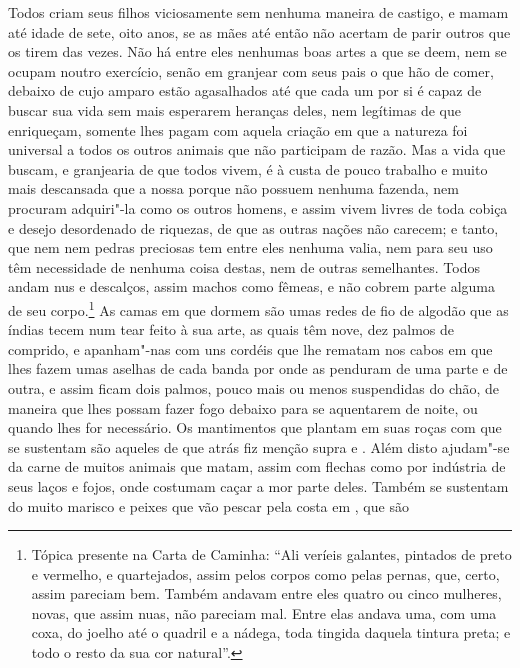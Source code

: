  Todos criam seus filhos viciosamente sem nenhuma maneira de castigo, e			%
mamam até idade de sete, oito anos, se as mães até então não acertam de
parir outros que os tirem das vezes. Não há entre eles nenhumas boas
artes a que se deem, nem se ocupam noutro exercício, senão em granjear
com seus pais o que hão de comer, debaixo de cujo amparo estão
agasalhados até que cada um por si é capaz de buscar sua vida sem mais
esperarem heranças deles, nem legítimas de que enriqueçam, somente lhes
pagam com aquela criação em que a natureza foi universal a todos os
outros animais que não participam de razão. Mas a vida que buscam, e
granjearia de que todos vivem, é à custa de pouco trabalho e muito mais descansada que a nossa porque não possuem nenhuma fazenda, nem procuram adquiri"-la como os outros homens, e assim vivem livres de toda cobiça e desejo
desordenado de riquezas, de que as outras nações não carecem; e tanto,
que  nem  nem pedras preciosas tem entre eles nenhuma valia,		%
nem para seu uso têm necessidade de nenhuma coisa destas, nem de outras
semelhantes. Todos andam nus e descalços, assim machos como fêmeas, e
não cobrem parte alguma de seu corpo.\footnote{ Tópica presente 
na Carta de Caminha: ``Ali veríeis galantes, pintados de
preto e vermelho, e quartejados, assim pelos corpos como pelas pernas, que,
certo, assim pareciam bem. Também andavam entre eles quatro ou cinco mulheres,
novas, que assim nuas, não pareciam mal. Entre elas andava uma, com uma coxa, do
joelho até o quadril e a nádega, toda tingida daquela tintura preta; e todo o
resto da sua cor natural''.} 
As camas em que dormem são umas
redes de fio de algodão que as índias tecem num tear feito à sua arte, as		%
quais têm nove, dez palmos de comprido, e apanham"-nas com uns cordéis
que lhe rematam nos cabos em que lhes fazem umas aselhas
de cada banda por onde as penduram de uma parte e de outra, e assim
ficam dois palmos, pouco mais ou menos suspendidas do chão, de maneira
que lhes possam fazer fogo debaixo para se aquentarem de noite, ou
quando lhes for necessário. Os mantimentos que plantam em suas roças			%
com que se sustentam são aqueles de que atrás fiz menção supra
 e . Além disto ajudam"-se da carne de muitos	%
animais que matam, assim com flechas como por indústria de seus laços e
fojos, onde costumam caçar a mor parte deles. Também se sustentam do
muito marisco e peixes que vão pescar pela costa em , que são		%
